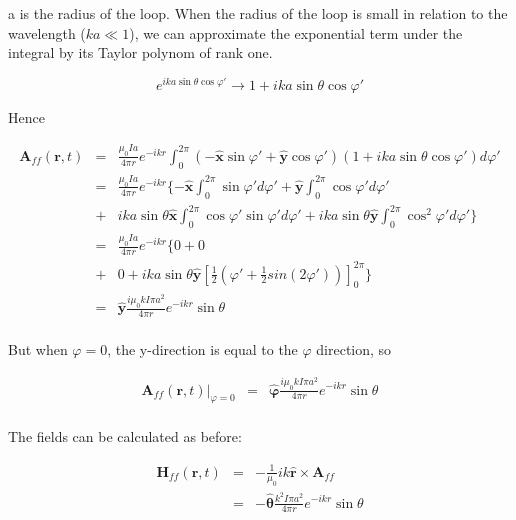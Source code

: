 \documentclass[a4paper,14pt]{extbook}
\begin{document}
a is the radius of the loop. When the radius of the loop is small in relation to the wavelength ($ka\ll 1$), we can approximate the exponential term under the integral by its Taylor polynom of rank one.

\begin{equation}\label{taylor}
e^{ik a\sin \theta \cos \varphi' } \rightarrow 1+ik a\sin \theta \cos \varphi'
\end{equation}

Hence

\begin{eqnarray}\label{A_loop_2}
 \mathbf{A}_{ff}(\mathbf{r},t) &=& \frac{\mu_0 I a}{4 \pi r} e^{-ikr} \int_{0}^{2\pi} (-\mathbf{\hat{x}}\sin \varphi ' + \mathbf{\hat{y}} \cos \varphi ') (1+ik a\sin \theta \cos \varphi')   d\varphi' \nonumber \\
&=& \frac{\mu_0 I a}{4 \pi r} e^{-ikr} \{ - \mathbf{\hat{x}} \int_{0}^{2\pi} \sin \varphi ' d\varphi' +  \mathbf{\hat{y}} \int_{0}^{2\pi}  \cos \varphi ' d\varphi' \nonumber \\
&+&  ik a \sin \theta \mathbf{\hat{x}} \int_{0}^{2\pi}  \cos \varphi' \sin \varphi ' d\varphi'+  ik a\sin \theta  \mathbf{\hat{y}} \int_{0}^{2\pi}\cos^2 \varphi'  d\varphi' \} \nonumber \\
&=& \frac{\mu_0 I a}{4 \pi r} e^{-ikr} \{ 0 +  0 \nonumber \\
&+&  0 +  ik a \sin \theta \mathbf{\hat{y}} \left[ \frac{1}{2} \left( \varphi' +\frac{1}{2} sin(2\varphi') \right) \right]_{0}^{2\pi} \} \nonumber \\
&=& \mathbf{\hat{y}} \frac{i \mu_0 k I \pi a^2}{4 \pi r} e^{-ikr} \sin \theta  \nonumber \\
\end{eqnarray}

But when $\varphi = 0$, the y-direction is equal to the $\varphi$ direction, so

\begin{eqnarray}\label{A_loop_2}
 \mathbf{A}_{ff}(\mathbf{r},t)|_{\varphi=0} &=& \mathbf{\hat{\varphi} }\frac{i \mu_0 k I \pi a^2}{4 \pi r} e^{-ikr} \sin \theta  \nonumber \\
\end{eqnarray}

The fields can be calculated as before:

\begin{eqnarray}
\mathbf{H}_{ff} (\mathbf{r},t)&=& - \frac{1}{\mu_0} ik\mathbf{\hat{r}} \times \mathbf{A}_{ff} \label{Hff_loop}\\
&=& - \mathbf{\hat{\theta}} \frac{k^2 I \pi a^2}{4 \pi r} e^{-ikr} \sin \theta \nonumber
\end{eqnarray}
\end{document}
